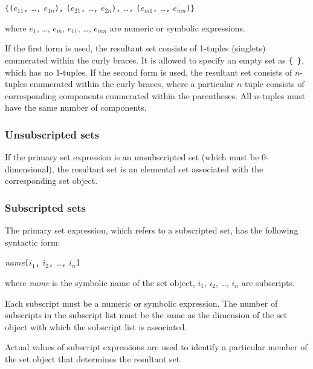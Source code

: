 \documentclass[10pt]{article}
\begin{document}
\medskip

\noindent\hfil
{\tt\{(}$e_{11}${\tt,} \dots{\tt,} $e_{1n}${\tt),}
{\tt(}$e_{21}${\tt,} \dots{\tt,} $e_{2n}${\tt),} \dots{\tt,}
{\tt(}$e_{m1}${\tt,} \dots{\tt,} $e_{mn}${\tt)\}}

\medskip

\noindent where $e_1$, \dots, $e_m$, $e_{11}$, \dots, $e_{mn}$ are
numeric or symbolic expressions.

If the first form is used, the resultant set consists of 1-tuples
(singlets) enumerated within the curly braces. It is allowed to specify
an empty set as {\tt\{\ \}}, which has no 1-tuples. If the second form
is used, the resultant set consists of $n$-tuples enumerated within the
curly braces, where a particular $n$-tuple consists of corresponding
components enumerated within the parentheses. All $n$-tuples must have
the same number of components.

\subsubsection{Unsubscripted sets}

If the primary set expression is an unsubscripted set (which must be
0-dimen\-sional), the resultant set is an elemental set associated with
the corresponding set object.

\newpage

\subsubsection{Subscripted sets}

The primary set expression, which refers to a subscripted set, has the
following syntactic form:

\medskip

\noindent\hfil
{\it name}{\tt[}$i_1${\tt,} $i_2${\tt,} \dots{\tt,} $i_n${\tt]}

\medskip

\noindent where {\it name} is the symbolic name of the set object,
$i_1$, $i_2$, \dots, $i_n$ are subscripts.

Each subscript must be a numeric or symbolic expression. The number of
subscripts in the subscript list must be the same as the dimension of
the set object with which the subscript list is associated.

Actual values of subscript expressions are used to identify a
particular member of the set object that determines the resultant set.
\end{document}
